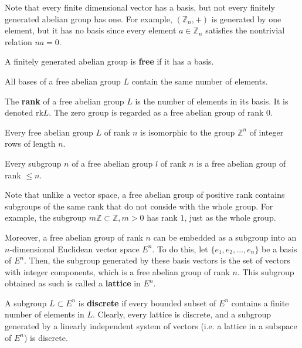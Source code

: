 \documentclass{article}
\begin{document}
    Note that every finite dimensional vector has a basis, but not every finitely generated abelian group has one. For example, $(\mathbb{Z}_n, +)$ is generated by one element, but it has no basis since every element $a \in \mathbb{Z}_n$ satisfies the nontrivial relation $n a = 0$. 

    \begin{definition}
      A finitely generated abelian group is \textbf{free} if it has a basis. 
    \end{definition}

    \begin{theorem}
      All bases of a free abelian group $L$ contain the same number of elements. 
    \end{theorem}

    \begin{definition}
      The \textbf{rank} of a free abelian group $L$ is the number of elements in its basis. It is denoted rk$L$. The zero group is regarded as a free abelian group of rank $0$. 
    \end{definition}

    \begin{theorem}
      Every free abelian group $L$ of rank $n$ is isomorphic to the group $\mathbb{Z}^n$ of integer rows of length $n$. 
    \end{theorem}

    \begin{theorem}
      Every subgroup $n$ of a free abelian group $l$ of rank $n$ is a free abelian group of rank $ \leq n$. 
    \end{theorem}

    Note that unlike a vector space, a free abelian group of positive rank contains subgroups of the same rank that do not conside with the whole group. For example, the subgroup $m \mathbb{Z} \subset \mathbb{Z}, m > 0$ has rank $1$, just as the whole group. 

    Moreover, a free abelian group of rank $n$ can be embedded as a subgroup into an $n$-dimensional Euclidean vector space $E^n$. To do this, let $\{e_1, e_2, ..., e_n\}$ be a basis of $E^n$. Then, the subgroup generated by these basis vectors is the set of vectors with integer components, which is a free abelian group of rank $n$. This subgroup obtained as such is called a \textbf{lattice} in $E^n$. 

    \begin{definition}
      A subgroup $L \subset E^n$ is \textbf{discrete} if every bounded subset of $E^n$ contains a finite number of elements in $L$. Clearly, every lattice is discrete, and a subgroup generated by a linearly independent system of vectors (i.e. a lattice in a subspace of $E^n$) is discrete. 
    \end{definition}
\end{document}
